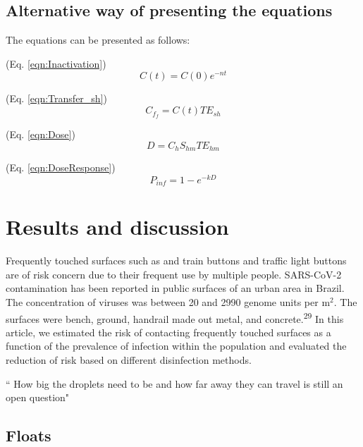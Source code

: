 \documentclass[journal=jacsat,manuscript=article]{achemso}
\begin{document}
\hypertarget{alternative-way-of-presenting-the-equations}{%
\subsection{Alternative way of presenting the
equations}\label{alternative-way-of-presenting-the-equations}}

The equations can be presented as follows:

(Eq. \ref{eqn:Inactivation}) \begin{equation}
C(t)= C(0) e^{-nt} \label{eqn:Inactivation}
\end{equation}

(Eq. \ref{eqn:Transfer_sh}) \begin{equation}
C_{f_f} = C(t) TE_{sh} \label{eqn:Transfer_sh}
\end{equation}

(Eq. \ref{eqn:Dose}) \begin{equation}
D = C_{h} S_{hm} TE_{hm} \label{eqn:Dose}
\end{equation}

(Eq. \ref{eqn:DoseResponse}) \begin{equation}
P_{inf}=1 - e^{-kD} \label{eqn:DoseResponse}
\end{equation}

\hypertarget{results-and-discussion}{%
\section{Results and discussion}\label{results-and-discussion}}

Frequently touched surfaces such as and train buttons and traffic light
buttons are of risk concern due to their frequent use by multiple
people. SARS-CoV-2 contamination has been reported in public surfaces of
an urban area in Brazil. The concentration of viruses was between 20 and
2990 genome units per m\(^2\). The surfaces were bench, ground, handrail
made out metal, and concrete.\textsuperscript{29} In this article, we
estimated the risk of contacting frequently touched surfaces as a
function of the prevalence of infection within the population and
evaluated the reduction of risk based on different disinfection methods.

`` How big the droplets need to be and how far away they can travel is
still an open question"

\hypertarget{floats}{%
\subsection{Floats}\label{floats}}
\end{document}
